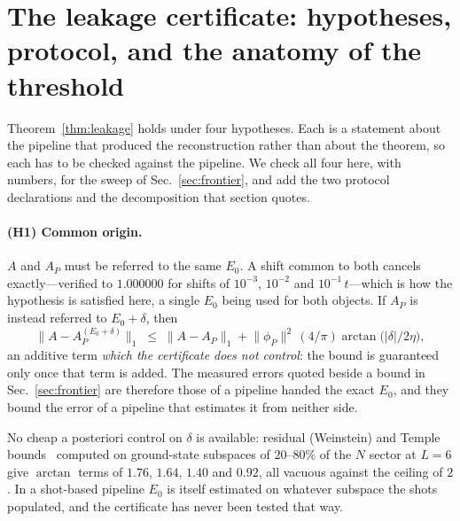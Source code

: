 
%
%
%
%

\section{The leakage certificate: hypotheses, protocol, and the anatomy of the threshold}
\label{app:hyp}

Theorem~\ref{thm:leakage} holds under four hypotheses. Each is a statement about the pipeline that
produced the reconstruction rather than about the theorem, so each has to be checked against the
pipeline. We check all
four here, with numbers, for the sweep of Sec.~\ref{sec:frontier}, and add the two protocol
declarations and the decomposition that section quotes.

\paragraph{(H1) Common origin.} $A$ and $A_P$ must be referred to the same $E_0$. A shift common to
both cancels exactly---verified to $1.000000$ for shifts of $10^{-3}$, $10^{-2}$ and
$10^{-1}\,t$---which is how the hypothesis is satisfied here, a single $E_0$ being used for both
objects. If $A_P$ is instead referred to $E_0+\delta$, then
\begin{equation*}
\lVert A-A_P^{(E_0+\delta)}\rVert_1\;\le\;\lVert A-A_P\rVert_1
+\lVert\phi_P\rVert^{2}\,(4/\pi)\arctan\bigl(\lvert\delta\rvert/2\eta\bigr),
\end{equation*}
%
%
an additive term \emph{which the certificate
does not control}: the bound is guaranteed only once that term is added. The measured
errors quoted beside a bound in Sec.~\ref{sec:frontier} are therefore those of a pipeline handed the
exact $E_0$, and they bound the error of a pipeline that estimates it from neither side.

No cheap a posteriori control on $\delta$ is available: residual (Weinstein) and Temple
bounds~\cite{weinstein1934,temple1928} computed on
ground-state subspaces of $20$--$80\%$ of the $N$ sector at $L=6$ give $\arctan$ terms of $1.76$,
$1.64$, $1.40$ and $0.92$, all vacuous against the ceiling of $2$. In a shot-based pipeline $E_0$ is
itself estimated on whatever subspace the shots populated, and the certificate has never been tested
that way.

